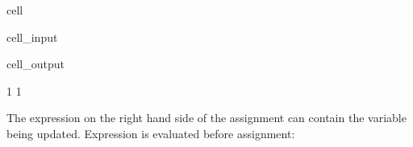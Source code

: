 \documentclass[a4paper,10pt,english]{jupyterBook}
\begin{document}
\begin{sphinxuseclass}{cell}\begin{sphinxVerbatimInput}

\begin{sphinxuseclass}{cell_input}
\begin{sphinxVerbatim}[commandchars=\\\{\}]


\end{sphinxVerbatim}

\end{sphinxuseclass}\end{sphinxVerbatimInput}
\begin{sphinxVerbatimOutput}

\begin{sphinxuseclass}{cell_output}
\begin{sphinxVerbatim}[commandchars=\\\{\}]
1 1 
\end{sphinxVerbatim}

\end{sphinxuseclass}\end{sphinxVerbatimOutput}

\end{sphinxuseclass}
\sphinxAtStartPar
The expression on the right hand side of the assignment can contain the variable being updated. Expression is evaluated before assignment:
\end{document}
